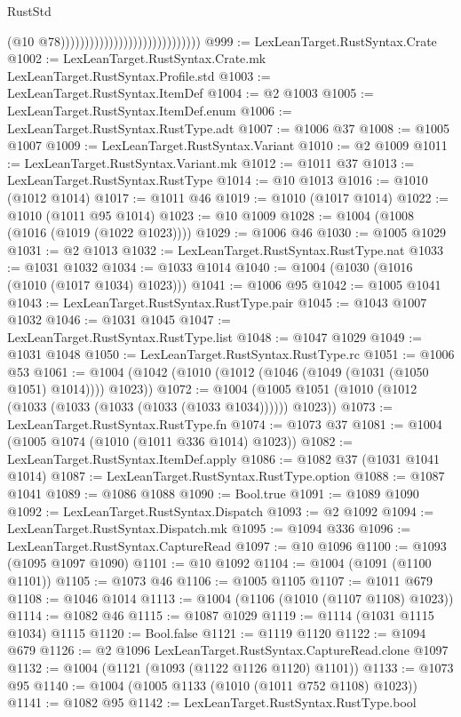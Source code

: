 \begin{lexlean}{RustStd}
\begin{coremodule}
                                                            (@10 @78)))))))))))))))))))))))))))))
@999 := LexLeanTarget.RustSyntax.Crate
@1002 := LexLeanTarget.RustSyntax.Crate.mk LexLeanTarget.RustSyntax.Profile.std
@1003 := LexLeanTarget.RustSyntax.ItemDef
@1004 := @2 @1003
@1005 := LexLeanTarget.RustSyntax.ItemDef.enum
@1006 := LexLeanTarget.RustSyntax.RustType.adt
@1007 := @1006 @37
@1008 := @1005 @1007
@1009 := LexLeanTarget.RustSyntax.Variant
@1010 := @2 @1009
@1011 := LexLeanTarget.RustSyntax.Variant.mk
@1012 := @1011 @37
@1013 := LexLeanTarget.RustSyntax.RustType
@1014 := @10 @1013
@1016 := @1010 (@1012 @1014)
@1017 := @1011 @46
@1019 := @1010 (@1017 @1014)
@1022 := @1010 (@1011 @95 @1014)
@1023 := @10 @1009
@1028 := @1004 (@1008 (@1016 (@1019 (@1022 @1023))))
@1029 := @1006 @46
@1030 := @1005 @1029
@1031 := @2 @1013
@1032 := LexLeanTarget.RustSyntax.RustType.nat
@1033 := @1031 @1032
@1034 := @1033 @1014
@1040 := @1004 (@1030 (@1016 (@1010 (@1017 @1034) @1023)))
@1041 := @1006 @95
@1042 := @1005 @1041
@1043 := LexLeanTarget.RustSyntax.RustType.pair
@1045 := @1043 @1007 @1032
@1046 := @1031 @1045
@1047 := LexLeanTarget.RustSyntax.RustType.list
@1048 := @1047 @1029
@1049 := @1031 @1048
@1050 := LexLeanTarget.RustSyntax.RustType.rc
@1051 := @1006 @53
@1061 := @1004 (@1042 (@1010 (@1012 (@1046 (@1049 (@1031 (@1050 @1051) @1014)))) @1023))
@1072 := @1004 (@1005 @1051 (@1010 (@1012 (@1033 (@1033 (@1033 (@1033 (@1033 @1034)))))) @1023))
@1073 := LexLeanTarget.RustSyntax.RustType.fn
@1074 := @1073 @37
@1081 := @1004 (@1005 @1074 (@1010 (@1011 @336 @1014) @1023))
@1082 := LexLeanTarget.RustSyntax.ItemDef.apply
@1086 := @1082 @37 (@1031 @1041 @1014)
@1087 := LexLeanTarget.RustSyntax.RustType.option
@1088 := @1087 @1041
@1089 := @1086 @1088
@1090 := Bool.true
@1091 := @1089 @1090
@1092 := LexLeanTarget.RustSyntax.Dispatch
@1093 := @2 @1092
@1094 := LexLeanTarget.RustSyntax.Dispatch.mk
@1095 := @1094 @336
@1096 := LexLeanTarget.RustSyntax.CaptureRead
@1097 := @10 @1096
@1100 := @1093 (@1095 @1097 @1090)
@1101 := @10 @1092
@1104 := @1004 (@1091 (@1100 @1101))
@1105 := @1073 @46
@1106 := @1005 @1105
@1107 := @1011 @679
@1108 := @1046 @1014
@1113 := @1004 (@1106 (@1010 (@1107 @1108) @1023))
@1114 := @1082 @46
@1115 := @1087 @1029
@1119 := @1114 (@1031 @1115 @1034) @1115
@1120 := Bool.false
@1121 := @1119 @1120
@1122 := @1094 @679
@1126 := @2 @1096 LexLeanTarget.RustSyntax.CaptureRead.clone @1097
@1132 := @1004 (@1121 (@1093 (@1122 @1126 @1120) @1101))
@1133 := @1073 @95
@1140 := @1004 (@1005 @1133 (@1010 (@1011 @752 @1108) @1023))
@1141 := @1082 @95
@1142 := LexLeanTarget.RustSyntax.RustType.bool

\end{coremodule}
\end{lexlean}
